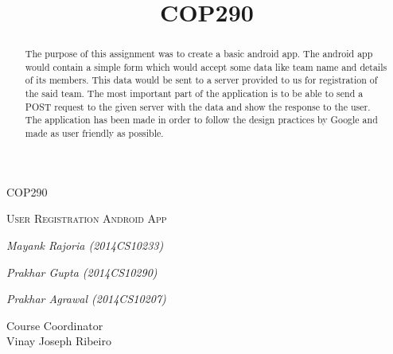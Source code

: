 \documentclass[12pt]{article}
\begin{document}
\begin{titlepage}
\title{COP290}
\centering
{\scshape\Large COP290\par}
\vspace{1cm}
{\scshape\Huge User Registration Android App\par}

\vspace{3cm}
	{\Large\itshape Mayank Rajoria (2014CS10233)\par}
\vspace{0.3cm}
	{\Large\itshape Prakhar Gupta (2014CS10290)\par}
\vspace{0.3cm}
	{\Large\itshape Prakhar Agrawal (2014CS10207)\par}

\vfill
\raggedleft
Course  Coordinator\\
Vinay Joseph Ribeiro
\end{titlepage}

\begin{abstract}
The purpose of this assignment was to create a basic android app. The android app would contain a simple form which would accept some data like team name and details of its members. This data would be sent to a server provided to us for registration of the said team. The most important part of the application is to be able to send a POST request to the given server with the data and show the response to the user. The application has been made in order to follow the design practices by Google and made as user friendly as possible.
\end{abstract}


\end{document}

